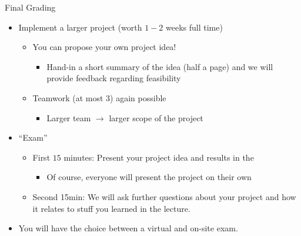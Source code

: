 \begin{frame}[c]{Final Grading}
	
	\begin{itemize}
		\item Implement a larger project (worth $1-2$ weeks full time)
		\begin{itemize}
			\item You can propose your own project idea!
			\begin{itemize}
				\item Hand-in a short summary of the idea (half a page) and we will provide feedback regarding feasibility
			\end{itemize}
			\item Teamwork (at most 3) again possible
			\begin{itemize}
				\item Larger team $\to$ larger scope of the project
			\end{itemize}
		\end{itemize}
		\item ``Exam''
		\begin{itemize}
			\item First $15$ minutes: Present your project idea and results in the 
			\begin{itemize}
				\item Of course, everyone will present the project on their own
			\end{itemize}
			\item Second 15min: We will ask further questions about your project and how it relates to stuff you learned in the lecture.
		\end{itemize}	
		\item You will have the choice between a virtual and on-site exam.
	\end{itemize}
	
\end{frame}
